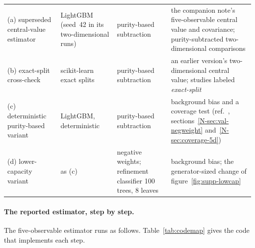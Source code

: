\begin{table}[htbp]
\begin{tabular}{@{}>{\raggedright\arraybackslash}p{}>{\raggedright\arraybackslash}p{}>{\raggedright\arraybackslash}p{}>{\raggedright\arraybackslash}p{}@{}}
(a) superseded central-value estimator & LightGBM (seed~42 in its two-dimensional runs) & purity-based subtraction & the companion note's five-observable central value and covariance; purity-subtracted two-dimensional comparisons \\ \addlinespace
(b) exact-split cross-check & scikit-learn exact splits & purity-based subtraction & an earlier version's two-dimensional central value; studies labeled \emph{exact-split} \\ \addlinespace
(c) deterministic purity-based variant & LightGBM, deterministic & purity-based subtraction & background bias and a coverage test (ref.~\cite{AnalysisNote2026}, sections~\ref*{N-sec:val-negweight} and~\ref*{N-sec:coverage-5d}) \\ \addlinespace
(d) lower-capacity variant & as (c) & negative weights; refinement classifier 100 trees, 8 leaves & background bias; the generator-sized change of figure~\ref{fig:supp-lowcap} \\
\bottomrule
\end{tabular}
\end{table}

\paragraph{The reported estimator, step by step.} The five-observable estimator runs as follows. Table~\ref{tab:codemap} gives the code that implements each step.

